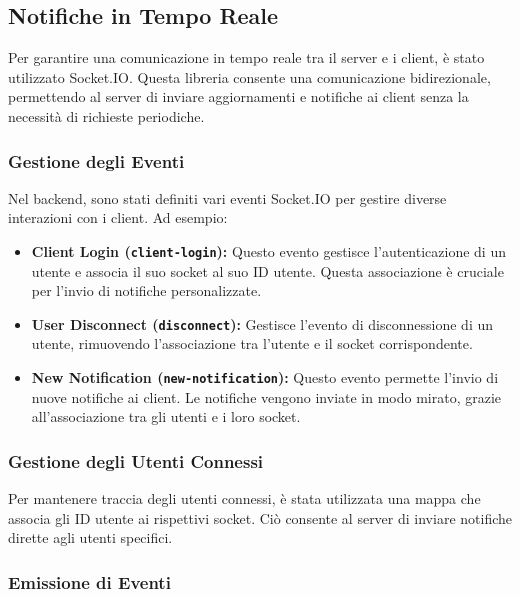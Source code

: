 \subsection{Notifiche in Tempo Reale}
Per garantire una comunicazione in tempo reale tra il server e i client, è stato utilizzato Socket.IO. Questa libreria consente una comunicazione bidirezionale, permettendo al server di inviare aggiornamenti e notifiche ai client senza la necessità di richieste periodiche.

\subsubsection{Gestione degli Eventi}

Nel backend, sono stati definiti vari eventi Socket.IO per gestire diverse interazioni con i client. Ad esempio:

\begin{itemize}
    \item \textbf{Client Login (\texttt{client-login}):} Questo evento gestisce l'autenticazione di un utente e associa il suo socket al suo ID utente. Questa associazione è cruciale per l'invio di notifiche personalizzate.

    \item \textbf{User Disconnect (\texttt{disconnect}):} Gestisce l'evento di disconnessione di un utente, rimuovendo l'associazione tra l'utente e il socket corrispondente.

    \item \textbf{New Notification (\texttt{new-notification}):} Questo evento permette l'invio di nuove notifiche ai client. Le notifiche vengono inviate in modo mirato, grazie all'associazione tra gli utenti e i loro socket.
\end{itemize}

\subsubsection{Gestione degli Utenti Connessi}

Per mantenere traccia degli utenti connessi, è stata utilizzata una mappa che associa gli ID utente ai rispettivi socket. Ciò consente al server di inviare notifiche dirette agli utenti specifici.

\subsubsection{Emissione di Eventi}

